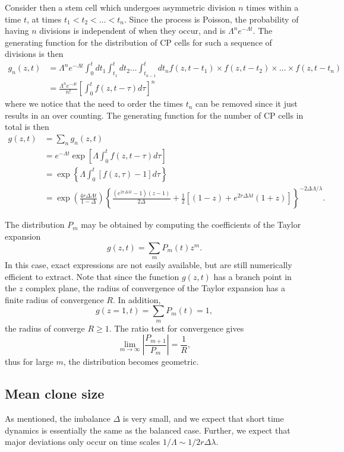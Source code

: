 \documentclass[10pt,UKenglish]{article}
\begin{document}
Consider then a stem cell which undergoes asymmetric division $n$ times within a time $t$, at times $t_1 < t_2 < \ldots < t_n$. Since the process is Poisson, the probability of having $n$ divisions is independent of when they occur, and is $\Lambda^n e^{-\Lambda t}$. The generating function for the distribution of CP cells for such a sequence of divisions is then
\begin{align*}
g_n(z,t) &= \Lambda^n e^{-\Lambda t} \int_0^t dt_1 \int_{t_1}^t dt_2 \ldots \int_{t_{n-1}}^t dt_n f(z,t-t_1) \times f(z,t-t_2) \times \ldots \times f(z,t-t_n) \\
 &= \frac{\Lambda^n e^{-\Lambda t}}{n!} \left[\int_0^t f(z,t-\tau) d\tau \right]^n
\end{align*}
where we notice that the need to order the times $t_n$ can be removed since it just results in an over counting. The generating function for the number of CP cells in total is then
\begin{align*}
g(z,t) &= \sum_n g_n(z,t) \\
 &= e^{-\Lambda t} \exp\left[\Lambda \int_0^t f(z,t-\tau) d\tau \right] \\
 &= \exp\left\{\Lambda \int_0^t \left[f(z,\tau) - 1\right] d\tau \right\} \\
 &= \exp\left(\frac{4 r \Delta \Lambda t}{1-\Delta}\right) \left\{ \frac{\left(e^{2 r \Delta \lambda t}-1 \right)(z-1)}{2\Delta} + \frac{1}{2}\left[(1-z) + e^{2 r \Delta \lambda t}(1+z) \right]\right\}^{-2\Delta\Lambda/\lambda}.
\end{align*}

The distribution $P_m$ may be obtained by computing the coefficients of the Taylor expansion $$g(z,t) = \sum_m P_m(t) z^m.$$ In this case, exact expressions are not easily available, but are still numerically efficient to extract. Note that since the function $g(z,t)$ has a branch point in the $z$ complex plane, the radius of convergence of the Taylor expansion has a finite radius of convergence $R$. In addition, $$g(z=1,t) = \sum_m P_m(t) = 1,$$ the radius of converge $R \ge 1$. The ratio test for convergence gives $$\lim_{m\rightarrow \infty} \left| \frac{P_{m+1}}{P_m} \right| = \frac{1}{R},$$ thus for large $m$, the distribution becomes geometric.

\subsection{Mean clone size}

As mentioned, the imbalance $\Delta$ is very small, and we expect that short time dynamics is essentially the same as the balanced case. Further, we expect that major deviations only occur on time scales $1/\Lambda \sim 1/2 r \Delta \lambda$.
\end{document}
